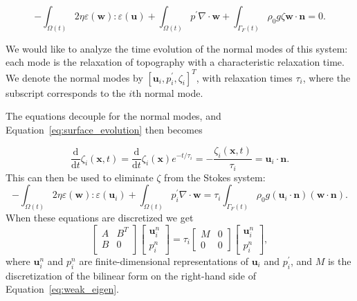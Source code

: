 \documentclass[preprint,12pt,authoryear]{elsarticle}
\begin{document}
\begin{equation}
-\int_{\Omega(t)} 2 \eta \varepsilon( \mathbf{w} ) \colon \varepsilon( \mathbf{u} ) + \int_{\Omega(t)} p^\prime \nabla \cdot \mathbf{w} 
+ \int_{\Gamma_F(t)} \rho_0 g \zeta  \mathbf{w} \cdot \mathbf{n} = 0.
\end{equation}

We would like to analyze the time evolution of the normal modes of this system: each mode 
is the relaxation of topography with a characteristic relaxation time.  
We denote the normal modes by $\left[ \mathbf{u}_i, p^\prime_i, \zeta_i \right]^T$, with
relaxation times $\tau_i$, where the subscript corresponds to the $i$th normal mode.

The equations decouple for the normal modes, and Equation~\eqref{eq:surface_evolution} then becomes

\begin{equation}
\frac {\text{d}}{\text{d} t} \zeta_i(\mathbf{x},t) = \frac{\text{d}}{\text{d}t} \zeta_i(\mathbf{x})e^{-t/\tau_i} = -\frac{\zeta_i(\mathbf{x},t)}{\tau_i} = \mathbf{u}_i \cdot \mathbf{n}.
\end{equation}
This can then be used to eliminate $\zeta$ from the Stokes system:
\begin{equation}
-\int_{\Omega(t)} 2 \eta \varepsilon( \mathbf{w} ) \colon \varepsilon( \mathbf{u}_i ) + \int_{\Omega(t)} p^\prime_i \nabla \cdot \mathbf{w} 
= \tau_i \int_{\Gamma_F(t)} \rho_0 g (\mathbf{u}_i \cdot \mathbf{n} ) (\mathbf{w} \cdot \mathbf{n}).
\label{eq:weak_eigen}
\end{equation}
When these equations are discretized \citep[e.g.][]{kronbichler2012high} we get
\begin{equation}
\begin{bmatrix}
A & B^T \\
B & 0 \\
\end{bmatrix}
\begin{bmatrix}
\mathbf{u}^n_i \\
p^n_i
\end{bmatrix}
=
\tau_i
\begin{bmatrix}
M & 0 \\
0 & 0
\end{bmatrix}
\begin{bmatrix}
\mathbf{u}^n_i \\
p^n_i
\end{bmatrix},
\label{eq:generalized_eigenvalue}
\end{equation}
where $\mathbf{u}^n_i$ and $p^n_i$ are finite-dimensional representations of $\mathbf{u}_i$ and $p^\prime_i$,
and $M$ is the discretization of the bilinear form on the right-hand side of Equation~\eqref{eq:weak_eigen}.
\end{document}
